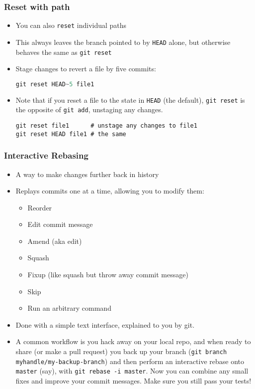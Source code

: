 \documentclass{beamer}
\begin{document}
\begin{frame}[fragile]
\frametitle{Reset with path}
\begin{itemize}
\item You can also \lstinline{reset} individual paths
\item This always leaves the branch pointed to by \texttt{HEAD} alone, but otherwise behaves the same as \lstinline{git reset}
\item Stage changes to revert a file by five commits:
\begin{lstlisting}[language=C++]
git reset HEAD~5 file1
\end{lstlisting}
\item Note that if you reset a file to the state in \texttt{HEAD} (the default), \lstinline{git reset} is the opposite of \lstinline{git add}, unstaging any changes.
\begin{lstlisting}
git reset file1      # unstage any changes to file1
git reset HEAD file1 # the same
\end{lstlisting}
\end{itemize}
\end{frame}

\begin{frame}[fragile]
\frametitle{Interactive Rebasing}
\begin{itemize}
\item A way to make changes further back in history
\item Replays commits one at a time, allowing you to modify them:
\begin{itemize}
\item Reorder
\item Edit commit message
\item Amend (aka edit)
\item Squash
\item Fixup (like squash but throw away commit message)
\item Skip
\item Run an arbitrary command
\end{itemize}
\item Done with a simple text interface, explained to you by git.
\item A common workflow is you hack away on your local repo, and when ready to share (or make a pull request) you back up your branch (\lstinline{git branch myhandle/my-backup-branch}) and then perform an interactive rebase onto \lstinline{master} (say), with \lstinline{git rebase -i master}. Now you can combine any small fixes and improve your commit messages. Make sure you still pass your tests!
\end{itemize}
\end{frame}
\end{document}
